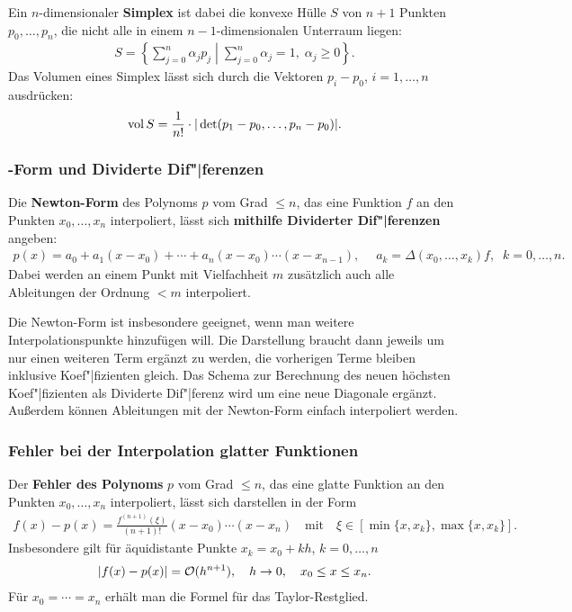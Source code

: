 \linie

Ein $n$-dimensionaler \textbf{Simplex} ist dabei die konvexe Hülle $S$ von
$n + 1$ Punkten $p_0, \dotsc, p_n$, die nicht alle in einem
$n - 1$-dimensionalen Unterraum liegen:
\begin{align*}
    S = \left\{\left.\sum_{j=0}^n \alpha_j p_j \;\right|\;
    \sum_{j=0}^n \alpha_j = 1,\; \alpha_j \ge 0\right\}.
\end{align*}
Das Volumen eines Simplex lässt sich durch die Vektoren $p_i - p_0$,
$i = 1, \dotsc, n$ ausdrücken:
\begin{align*}
    \operatorname{vol} S = \frac{1}{n!} \cdot |\det(p_1 - p_0, \dotsc, p_n - p_0)|.
\end{align*}

\subsubsection{%
    -Form und Dividerte Dif"|ferenzen%
}

Die \textbf{Newton-Form} des Polynoms $p$ vom Grad $\le n$, das eine Funktion
$f$ an den Punkten $x_0, \dotsc, x_n$ interpoliert, lässt sich
\textbf{mithilfe Dividerter Dif"|ferenzen} angeben:
\begin{align*}
    p(x) = a_0 + a_1 (x - x_0) + \dotsb + a_n (x - x_0) \dotsm (x - x_{n-1}),
    \quad\; a_k = \Delta(x_0, \dotsc, x_k)f,\;\; k = 0, \dotsc, n.
\end{align*}
Dabei werden an einem Punkt mit Vielfachheit $m$ zusätzlich auch alle
Ableitungen der Ordnung $< m$ interpoliert.

Die Newton-Form ist insbesondere geeignet, wenn man weitere
Interpolationspunkte hinzufügen will.
Die Darstellung braucht dann jeweils um nur einen weiteren Term ergänzt zu
werden, die vorherigen Terme bleiben inklusive Koef"|fizienten gleich.
Das Schema zur Berechnung des neuen höchsten Koef"|fizienten als
Dividerte Dif"|ferenz wird um eine neue Diagonale ergänzt. \\
Außerdem können Ableitungen mit der Newton-Form einfach interpoliert werden.

\subsubsection{%
    Fehler bei der Interpolation glatter Funktionen%
}

Der \textbf{Fehler des Polynoms} $p$ vom Grad $\le n$,
das eine glatte Funktion an den
Punkten $x_0, \dotsc, x_n$ interpoliert, lässt sich darstellen in der Form
\begin{align*}
    f(x) - p(x) = \frac{f^{(n+1)}(\xi)}{(n + 1)!} (x - x_0) \dotsm (x - x_n)
    \quad\text{mit}\quad \xi \in \left[\min\{x, x_k\},
    \max\{x, x_k\}\right].
\end{align*}
Insbesondere gilt für äquidistante Punkte $x_k = x_0 + kh$, $k = 0, \dotsc, n$
\begin{align*}
    |f(x) - p(x)| = \mathcal{O}(h^{n+1}),\quad h \to 0, \quad x_0 \le x \le x_n.
\end{align*}
Für $x_0 = \dotsb = x_n$ erhält man die Formel für das Taylor-Restglied.

